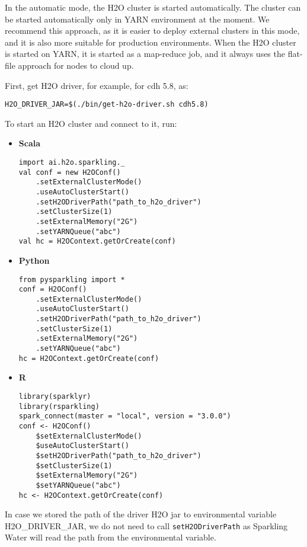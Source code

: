 In the automatic mode, the H2O cluster is started automatically. The cluster can be started automatically only in YARN
environment at the moment. We recommend this approach, as it is easier to deploy external clusters in this mode,
and it is also more suitable for production environments. When the H2O cluster is started on YARN, it is started
as a map-reduce job, and it always uses the flat-file approach for nodes to cloud up.

First, get H2O driver, for example, for cdh 5.8, as:

\begin{lstlisting}[style=bash]
H2O_DRIVER_JAR=$(./bin/get-h2o-driver.sh cdh5.8)
\end{lstlisting}


To start an H2O cluster and connect to it, run:

\begin{itemize}
    \item \textbf{Scala} \begin{lstlisting}[style=Scala]
import ai.h2o.sparkling._
val conf = new H2OConf()
    .setExternalClusterMode()
    .useAutoClusterStart()
    .setH2ODriverPath("path_to_h2o_driver")
    .setClusterSize(1)
    .setExternalMemory("2G")
    .setYARNQueue("abc")
val hc = H2OContext.getOrCreate(conf)
    \end{lstlisting}
    \item \textbf{Python} \begin{lstlisting}[style=Python]
from pysparkling import *
conf = H2OConf()
    .setExternalClusterMode()
    .useAutoClusterStart()
    .setH2ODriverPath("path_to_h2o_driver")
    .setClusterSize(1)
    .setExternalMemory("2G")
    .setYARNQueue("abc")
hc = H2OContext.getOrCreate(conf)
    \end{lstlisting}
    \item \textbf{R} \begin{lstlisting}[style=R]
library(sparklyr)
library(rsparkling)
spark_connect(master = "local", version = "3.0.0")
conf <- H2OConf()
    $setExternalClusterMode()
    $useAutoClusterStart()
    $setH2ODriverPath("path_to_h2o_driver")
    $setClusterSize(1)
    $setExternalMemory("2G")
    $setYARNQueue("abc")
hc <- H2OContext.getOrCreate(conf)
    \end{lstlisting}
\end{itemize}

In case we stored the path of the driver H2O jar to environmental variable H2O\_DRIVER\_JAR, we do not need
to call \texttt{setH2ODriverPath} as Sparkling Water will read the path from the environmental variable.

